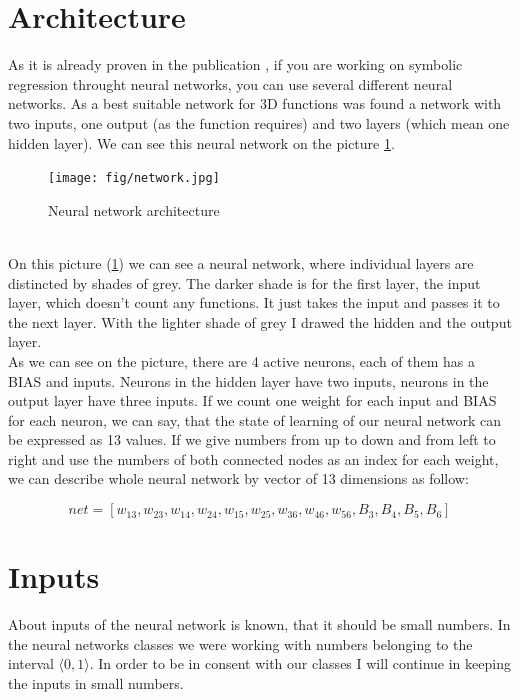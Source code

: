 \documentclass[a4paper,oneside,onecolumn,11pt]{report}
\begin{document}
	\section{Architecture}
		As it is already proven in the publication \cite{varacha2006}, if you are working on symbolic
		regression throught neural networks, you can use several different neural networks. As a best suitable
		network for 3D functions was found a network with two inputs, one output (as the function requires)
		and two layers (which mean one hidden layer). We can see this neural network on the picture \ref{n_net}.
		\begin{figure}
			\centering
			\texttt{[image: fig/network.jpg]}
			\caption{Neural network architecture}
			\label{n_net}
		\end{figure}\\
		On this picture (\ref{n_net}) we can see a neural network, where individual layers are 
		distincted by shades of grey. The darker shade is for the first layer, the input layer, which 
		doesn't count any functions. It just takes the input and passes it to the next layer. With the
		lighter shade of grey I drawed the hidden and the output layer. \\

		As we can see on the picture, there are 4 active neurons, each of them has a BIAS and inputs.
		Neurons in the hidden layer have two inputs, neurons in the output layer have three inputs. 
		If we count one weight for each input and BIAS for each neuron, we can say, that the state
		of learning of our neural network can be expressed as 13 values. If we give numbers from 
		up to down and from left to right and use the numbers of both connected nodes as an index for
		each weight, we can describe whole neural network by vector of 13 dimensions as follow:

		\begin{equation}
			net = [w_{13}, w_{23}, w_{14}, w_{24}, w_{15}, w_{25}, w_{36}, w_{46}, w_{56}, B_3, B_4, B_5, B_6]
		\end{equation}

	\section{Inputs}
		About inputs of the neural network is known, that it should be small numbers. In the neural networks
		classes we were working with numbers belonging to the interval $\langle 0, 1 \rangle$. In order to
		be in consent with our classes I will continue in keeping the inputs in small numbers. \\
\end{document}
